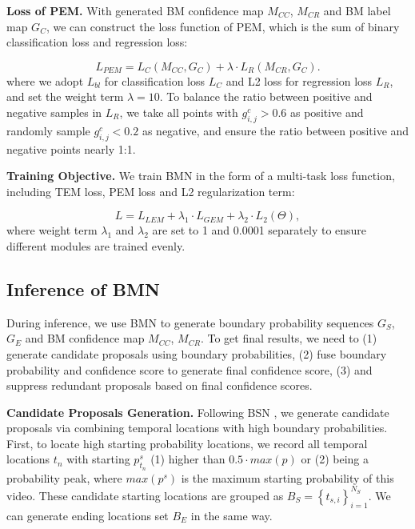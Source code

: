 \documentclass[10pt,twocolumn,letterpaper]{article}
\begin{document}

\noindent
\textbf{Loss of PEM.}
With generated BM confidence map $M_{CC}$, $M_{CR}$ and BM label map $G_C$, we can construct the loss function of PEM, which is the sum of binary classification loss and regression loss:

\begin{equation}
L_{PEM}=  L_{C}(M_{CC},G_C) + \lambda \cdot L_{R}(M_{CR},G_C).
\end{equation}
%
where we adopt $L_{bl}$ for classification loss $L_C$ and L2 loss for regression loss $L_R$, and set the weight term $\lambda=10$. 
%
To balance the ratio between positive and negative samples in $L_R$, we take all points with $g^c_{i,j} >0.6$ as positive and randomly sample  $g^c_{i,j} <0.2$ as negative, and ensure the ratio between positive and negative points nearly 1:1.


\noindent
\textbf{Training Objective.}
%
We train BMN  in the form of a multi-task loss function, including TEM loss, PEM loss and L2 regularization term:


\begin{equation}
L = L_{LEM}+\lambda_1 \cdot L_{GEM} + \lambda_2 \cdot L_2(\Theta),
\end{equation}
%
where weight term $\lambda_1 $ and $\lambda_2 $ are set to 1 and 0.0001 separately to ensure different modules are trained evenly.



\subsection{Inference of BMN}

During inference, we use BMN to generate boundary probability sequences $G_S$, $G_E$ and BM confidence map $M_{CC}$, $M_{CR}$. To get final results, we need to (1) generate candidate proposals using boundary probabilities, (2) fuse boundary probability and confidence score to generate final confidence score, (3) and suppress redundant proposals based on final confidence scores. 

\noindent
\textbf{Candidate Proposals Generation.}
%
Following BSN \cite{lin2018bsn}, we generate candidate proposals via combining  temporal locations with high boundary probabilities. 
%
First, to locate high starting probability locations, we record all temporal locations $t_n$ with starting $p^s_{t_n}$ (1) higher than $0.5\cdot max(p)$ or (2) being a probability peak, where $max(p^s)$ is the maximum starting probability of this video. These candidate starting locations are grouped as $B_S=\left \{ t_{s,i} \right \}_{i=1}^{N_S}$. 
%
We can generate ending locations set $B_E$ in the same way.
\end{document}
